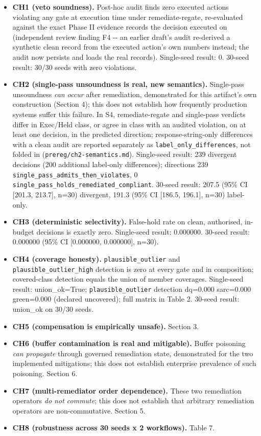 \documentclass[11pt,a4paper]{article}
\theoremstyle{definition}
\begin{document}
\begin{itemize}
\item \textbf{CH1 (veto soundness).} Post-hoc audit finds zero executed actions violating any gate at execution time under remediate-regate, re-evaluated against the exact Phase II evidence records the decision executed on (independent review finding F4 -{}- an earlier draft's audit re-derived a synthetic clean record from the executed action's own numbers instead; the audit now persists and loads the real records). Single-seed result: 0. 30-seed result: 30/30 seeds with zero violations.
\item \textbf{CH2 (single-pass unsoundness is real, new semantics).} Single-pass unsoundness \textit{can occur} after remediation, demonstrated for this artifact's own construction (Section 4); this does not establish how frequently production systems suffer this failure. In S4, remediate-regate and single-pass verdicts differ in Exec/Held class, or agree in class with an audited violation, on at least one decision, in the predicted direction; response-string-only differences with a clean audit are reported separately as \texttt{label\_only\_differences}, not folded in (\texttt{prereg/ch2-semantics.md}). Single-seed result: 239 divergent decisions (200 additional label-only differences); directions 239 \texttt{single\_pass\_admits\_then\_violates}, 0 \texttt{single\_pass\_holds\_remediated\_compliant}. 30-seed result: 207.5 (95\% CI [201.3, 213.7], n=30) divergent, 191.3 (95\% CI [186.5, 196.1], n=30) label-only.
\item \textbf{CH3 (deterministic selectivity).} False-hold rate on clean, authorised, in-budget decisions is exactly zero. Single-seed result: 0.000000. 30-seed result: 0.000000 (95\% CI [0.000000, 0.000000], n=30).
\item \textbf{CH4 (coverage honesty).} \texttt{plausible\_outlier} and \texttt{plausible\_outlier\_high} detection is zero at every gate and in composition; covered-class detection equals the union of member coverages. Single-seed result: union\_ok=True; \texttt{plausible\_outlier} detection dq=0.000 sarc=0.000 green=0.000 (declared uncovered); full matrix in Table 2. 30-seed result: union\_ok on 30/30 seeds.
\item \textbf{CH5 (compensation is empirically unsafe).} Section 3.
\item \textbf{CH6 (buffer contamination is real and mitigable).} Buffer poisoning \textit{can propagate} through governed remediation state, demonstrated for the two implemented mitigations; this does not establish enterprise prevalence of such poisoning. Section 6.
\item \textbf{CH7 (multi-remediator order dependence).} These two remediation operators \textit{do not commute}; this does not establish that arbitrary remediation operators are non-commutative. Section 5.
\item \textbf{CH8 (robustness across 30 seeds x 2 workflows).} Table 7.
\end{itemize}
\end{document}
